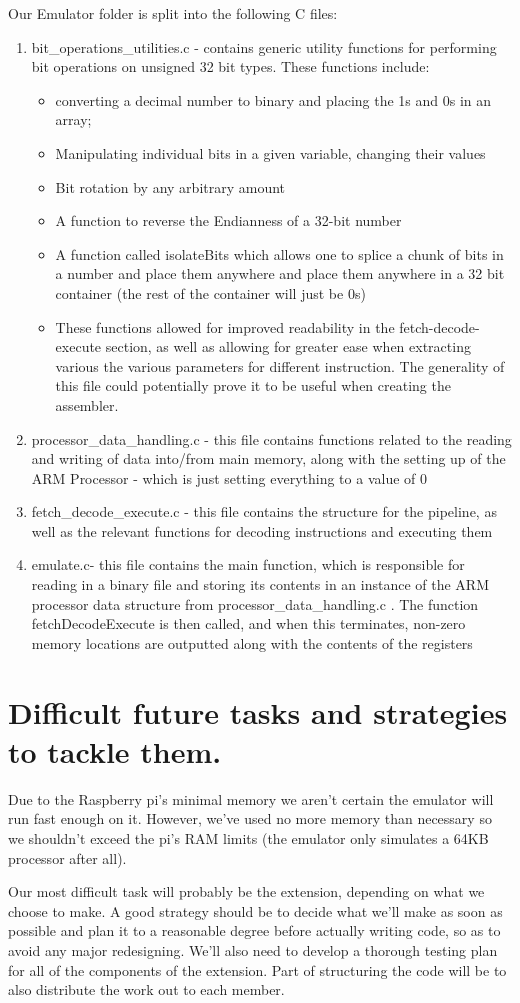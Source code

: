 \documentclass[a4paper]{article}
\begin{document}
Our Emulator folder is split into the following C files:
\begin{enumerate}
\item bit\_operations\_utilities.c - contains generic utility functions for performing bit operations on unsigned 32 bit types. These functions include: 
\begin{itemize}
\item converting a decimal number to binary and placing the 1s and 0s in an array;
\item Manipulating individual bits in a given variable, changing their values 
\item Bit rotation by any arbitrary amount
\item A function to reverse the Endianness of a 32-bit number
\item A function called isolateBits which allows one to splice a chunk of bits in a number and place them anywhere and place them anywhere in a 32 bit container (the rest of the container will just be 0s)
\item These functions allowed for improved readability in the fetch-decode-execute section, as well as allowing for greater ease when extracting various the various parameters for different instruction. The generality of this file could potentially prove it to be useful when creating the assembler.
\end{itemize}
\item processor\_data\_handling.c - this file contains functions related to the reading and writing of data into/from main memory, along with the setting up of the ARM Processor - which is just setting everything to a value of 0
\item fetch\_decode\_execute.c - this file contains the structure for the pipeline, as well as the relevant functions for decoding instructions and executing them
\item emulate.c- this file contains the main function, which is responsible for reading in a binary file and storing its contents in an instance of the ARM processor data structure from processor\_data\_handling.c . The function fetchDecodeExecute is then called, and when this terminates, non-zero memory locations are outputted along with the contents of the registers
\end{enumerate}


\section{Difficult future tasks and strategies to tackle them.}
Due to the Raspberry pi's minimal memory we aren't certain the emulator will run fast enough on it. However, we've used no more memory than necessary so we shouldn't exceed the pi's RAM limits (the emulator only simulates  a 64KB processor after all). 

Our most difficult task will probably be the extension, depending on what we choose to make. A good strategy should be to decide what we'll make as soon as possible and plan it to a reasonable degree before actually writing code, so as to avoid any major redesigning. We'll also need to develop a thorough testing plan for all of the components of the extension. Part of structuring the code will be to also distribute the work out to each member.
\end{document}
